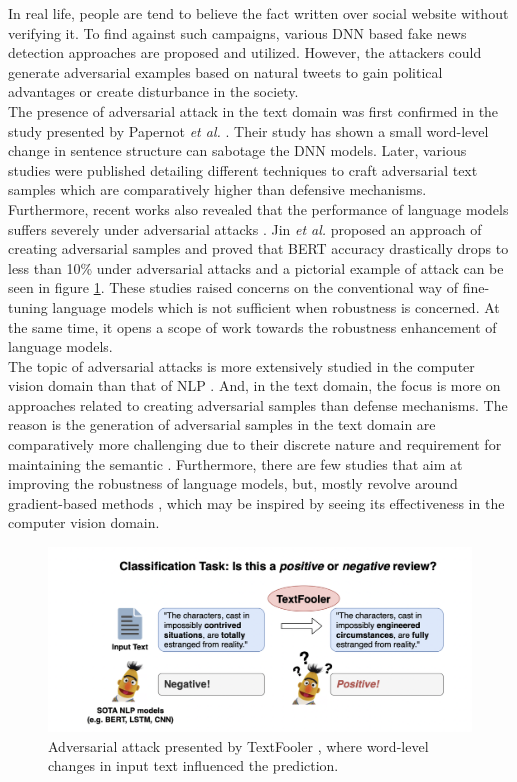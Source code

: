 \documentclass[%
	BCOR=8mm, %
	DIV=12,
	toc=bibliography, %
	toc=listof, %
	oneside, %
	egregdoesnotlikesansseriftitles, %
	]{scrbook}
\begin{document}
In real life, people are tend to believe the fact written over social website without verifying it. To find against such campaigns, various DNN based fake news detection approaches are proposed and utilized. However, the attackers could generate adversarial examples based on natural tweets to gain political advantages or create disturbance in  the society. \\
The presence of adversarial attack in the text domain was first confirmed in the study presented by Papernot \textit{et al.} \cite{papernot_crafting_2016}. Their  study has shown  a small word-level change in sentence structure can sabotage the DNN models. Later, various studies were published detailing different techniques to craft adversarial text samples which are comparatively higher than defensive mechanisms. \\
Furthermore,  recent works also revealed that the performance of language models suffers severely under adversarial attacks \cite{li_bert-attack_2020,garg_bae_2020,moradi_evaluating_2021-1}. Jin \textit{et al.} \cite{jin_is_2020}  proposed an approach of creating adversarial samples and proved that BERT accuracy drastically drops to less than 10\% under adversarial attacks and a pictorial example of attack can be seen in figure \ref{diag:ExampleAdversarial}. These studies raised concerns on the conventional way of fine-tuning language models which is not sufficient when robustness is concerned. At the same time, it opens a scope of work towards the robustness enhancement of language models.\\
The topic of adversarial attacks is more extensively studied in the computer vision domain than that of NLP \cite{wang_towards_2021}. And, in the text domain, the focus is more on approaches related to creating adversarial samples than defense mechanisms. The reason is the generation of adversarial samples in the text domain are comparatively more challenging due to their discrete nature and requirement for maintaining the semantic \cite{li_bert-attack_2020}. Furthermore, there are few studies that aim at improving the robustness of language models, but, mostly revolve around gradient-based methods \cite{zhu_at-bert_2021,miyato_adversarial_2017,jiang_smart_2020-1}, which may be inspired by seeing its effectiveness in the computer vision domain.\\
\begin{figure}[H]
    \centering
    \includegraphics[width=.90\textwidth]{img/Introduction-Fig-1.png}
    \caption[Example of Adversarial attack in text-domain]{Adversarial attack presented by TextFooler \cite{jin_is_2020}, where word-level changes in input text influenced the prediction.}
    \label{diag:ExampleAdversarial}
\end{figure}
\end{document}
